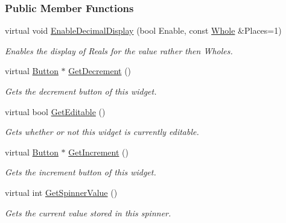\subsubsection*{Public Member Functions}
\begin{DoxyCompactItemize}
\item 
virtual void \hyperlink{classMezzanine_1_1UI_1_1Spinner_a8aec532dd425a40f9ea677e47fac730e}{EnableDecimalDisplay} (bool Enable, const \hyperlink{namespaceMezzanine_adcbb6ce6d1eb4379d109e51171e2e493}{Whole} \&Places=1)
\begin{DoxyCompactList}\small\item\em Enables the display of Reals for the value rather then Wholes. \item\end{DoxyCompactList}\item 
virtual \hyperlink{classMezzanine_1_1UI_1_1Button}{Button} $\ast$ \hyperlink{classMezzanine_1_1UI_1_1Spinner_a0268c48ff92989645ae5780b4715bc53}{GetDecrement} ()
\begin{DoxyCompactList}\small\item\em Gets the decrement button of this widget. \item\end{DoxyCompactList}\item 
virtual bool \hyperlink{classMezzanine_1_1UI_1_1Spinner_aa483b7cd680996e364156e0dcb774070}{GetEditable} ()
\begin{DoxyCompactList}\small\item\em Gets whether or not this widget is currently editable. \item\end{DoxyCompactList}\item 
virtual \hyperlink{classMezzanine_1_1UI_1_1Button}{Button} $\ast$ \hyperlink{classMezzanine_1_1UI_1_1Spinner_ad0a0508df75f896075ba08e13afcc946}{GetIncrement} ()
\begin{DoxyCompactList}\small\item\em Gets the increment button of this widget. \item\end{DoxyCompactList}\item 
virtual int \hyperlink{classMezzanine_1_1UI_1_1Spinner_a3b184c448b853d3424aaf5d1b1d836a2}{GetSpinnerValue} ()
\begin{DoxyCompactList}\small\item\em Gets the current value stored in this spinner. \item\end{DoxyCompactList}\item 

\end{DoxyCompactItemize}

